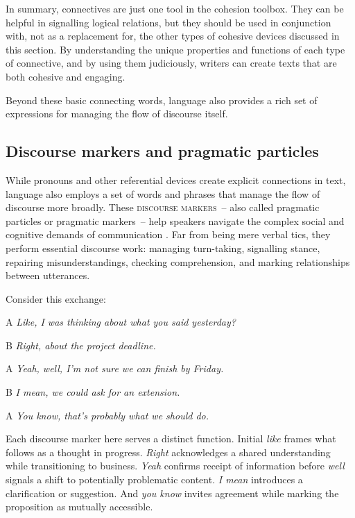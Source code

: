 In summary, connectives are just one tool in the cohesion toolbox. They can be helpful in signalling logical relations, but they should be used in conjunction with, not as a replacement for, the other types of cohesive devices discussed in this section. By understanding the unique properties and functions of each type of connective, and by using them judiciously, writers can create texts that are both cohesive and engaging.

Beyond these basic connecting words, language also provides a rich set of expressions for managing the flow of discourse itself.

\subsection{Discourse markers and pragmatic particles}\label{sec:discourse-markers}

While pronouns and other referential devices create explicit connections in text, language also employs a set of words and phrases that manage the flow of discourse more broadly. These \textsc{discourse markers}~-- also called pragmatic particles or pragmatic markers~-- help speakers navigate the complex social and cognitive demands of communication \citep{Schiffrin1987}. Far from being mere verbal tics, they perform essential discourse work: managing turn-taking, signalling stance, repairing misunderstandings, checking comprehension, and marking relationships between utterances.

Consider this exchange:

\begin{dialogue}
\item[A] \textit{Like, I was thinking about what you said yesterday?}
\item[B] \textit{Right, about the project deadline.}
\item[A] \textit{Yeah, well, I'm not sure we can finish by Friday.}
\item[B] \textit{I mean, we could ask for an extension.}
\item[A] \textit{You know, that's probably what we should do.}
\end{dialogue}

Each discourse marker here serves a distinct function. Initial \textit{like} frames what follows as a thought in progress. \textit{Right} acknowledges a shared understanding while transitioning to business. \textit{Yeah} confirms receipt of information before \textit{well} signals a shift to potentially problematic content. \textit{I mean} introduces a clarification or suggestion. And \textit{you know} invites agreement while marking the proposition as mutually accessible.

